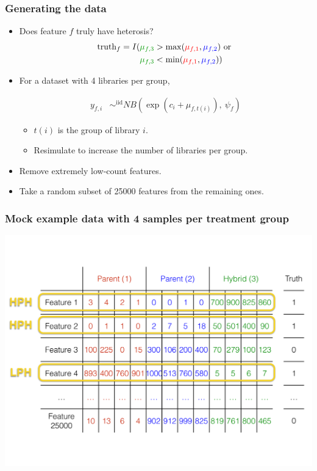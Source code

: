 \documentclass[handout]{beamer}
\numberwithin{equation}{section}
\begin{document}
\begin{frame}
\frametitle{Generating the data}

\begin{itemize}
\item Does feature $f$ truly have heterosis?
\begin{align*}
\text{truth}_f = I(&{\color{dkgreen}\mu_{f, 3}} > \max({\color{red}\mu_{f, 1}}, {\color{blue}\mu_{f, 2}}) \text{ or } \\ &{\color{dkgreen}\mu_{f, 3}} < \min({\color{red}\mu_{f, 1}}, {\color{blue}\mu_{f, 2}}))
\end{align*}

\pause 

\item For a dataset with 4 libraries per group,


\begin{align*}
y_{f, i} &\mathop{\sim}^{\text{iid}} NB\left (\exp \left ( c_{i} + \mu_{f, t(i)} \right ), \ \psi_f  \right )
\end{align*}

\begin{itemize}
\item $t(i)$ is the group of library $i$.
\pause \item Resimulate to increase the number of libraries per group.
\end{itemize}



\pause \item Remove extremely low-count features.
\pause \item Take a random subset of 25000 features from the remaining ones.
\end{itemize}
\end{frame}

\begin{frame}
\frametitle{Mock example data with 4 samples per treatment group}
\begin{center}
\includegraphics[scale=.28]{data}
\end{center}
\end{frame}
\end{document}
